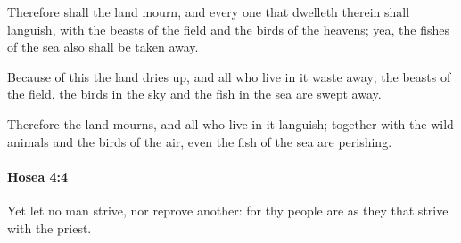 			\begin{versebox}
					\item[BHS] 
					\item[LXX] 
					\item[ASV] Therefore shall the land mourn, and every one that dwelleth therein shall languish, with the beasts of the field and the birds of the heavens; yea, the fishes of the sea also shall be taken away.
					\item[NIV] Because of this the land dries up, and all who live in it waste away; the beasts of the field, the birds in the sky and the fish in the sea are swept away.
					\item[NRSV] Therefore the land mourns, and all who live in it languish; together with the wild animals and the birds of the air, even the fish of the sea are perishing.
			\end{versebox}

		\paragraph{Hosea 4:4} %
			\label{HOSEA-4-4}

			Yet let no man strive, nor reprove another: for thy people are as they that strive with the priest.

